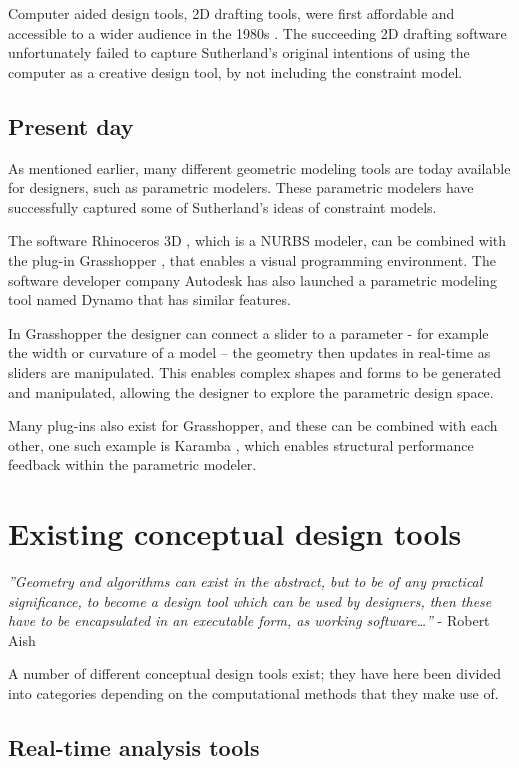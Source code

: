 Computer aided design tools, 2D drafting tools, were first affordable and accessible to a wider audience in the 1980s \cite{Aish2005}. The succeeding 2D drafting software unfortunately failed to capture Sutherland’s original intentions of using the computer as a creative design tool, by not including the constraint model. 

\subsection{Present day}
As mentioned earlier, many different geometric modeling tools are today available for designers, such as parametric modelers. These parametric modelers have successfully captured some of Sutherland’s ideas of constraint models. 

The software Rhinoceros 3D \cite{Rhino}, which is a NURBS modeler, can be combined with the plug-in Grasshopper \cite{Grasshopper}, that enables a visual programming environment. The software developer company Autodesk has also launched a parametric modeling tool named Dynamo \cite{Dynamo} that has similar features.


In Grasshopper the designer can connect a slider to a parameter - for example the width or curvature of a model – the geometry then updates in real-time as sliders are manipulated. This enables complex shapes and forms to be generated and manipulated, allowing the designer to explore the parametric design space. 

Many plug-ins also exist for Grasshopper, and these can be combined with each other, one such example is Karamba \cite{Karamba}, which enables structural performance feedback within the parametric modeler. 

\section{Existing conceptual design tools}

\textit{''Geometry and algorithms can exist in the abstract, but to be of any practical significance, to become a design tool which can be used by designers, then these have to be encapsulated in an executable form, as working software…''} - Robert Aish \cite{Shea2005}

A number of different conceptual design tools exist; they have here been divided into categories depending on the computational methods that they make use of.

\subsection{Real-time analysis tools}

